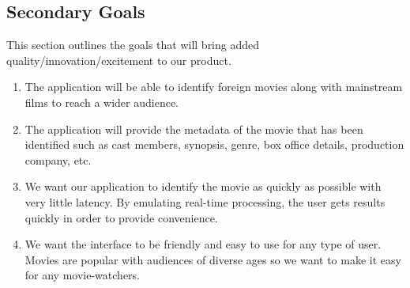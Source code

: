 \documentclass[12pt, titlepage]{article}
\begin{document}
\subsection{Secondary Goals}
\label{sub:secondary_goals}

This section outlines the goals that will bring added quality/innovation/excitement to our product.

	
\begin{enumerate}
    \item The application will be able to identify foreign movies along with mainstream films to reach a wider audience. 
	\item The application will provide the metadata of the movie that has been identified such as cast members, synopsis, genre, box office details, production company, etc.
	\item We want our application to identify the movie as quickly as possible with very little latency. By emulating real-time processing, the user gets results quickly in order to provide convenience.
	\item We want the interface to be friendly and easy to use for any type of user. Movies are popular with audiences of diverse ages so we want to make it easy for any movie-watchers.
\end{enumerate}

\end{document}
